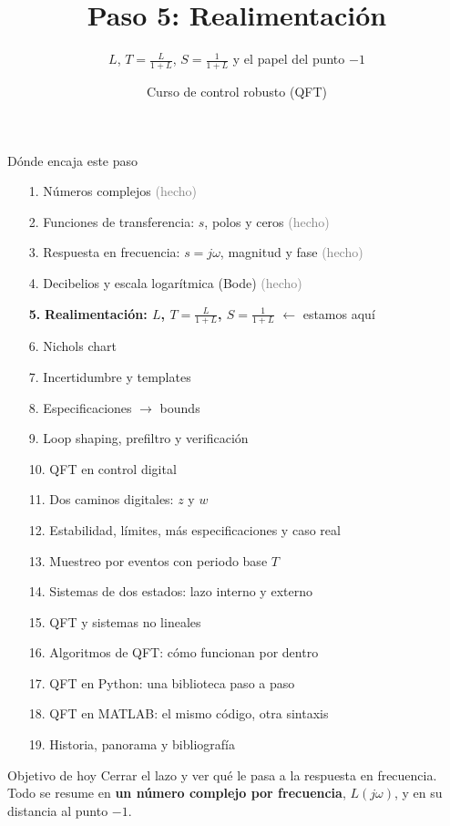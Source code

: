 \documentclass[aspectratio=169,11pt]{beamer}
\title[Realimentación]{Paso 5: Realimentación}
\subtitle{$L$, $T=\frac{L}{1+L}$, $S=\frac{1}{1+L}$ y el papel del punto $-1$}
\author{Curso de control robusto (QFT)}
\date{}
\begin{document}
\begin{frame}\titlepage\end{frame}

\begin{frame}{Dónde encaja este paso}
  \tiny
  \begin{enumerate}\setlength{\itemsep}{-2pt}
    \item[1.] Números complejos \hfill \textcolor{gray}{(hecho)}
    \item[2.] Funciones de transferencia: $s$, polos y ceros \hfill \textcolor{gray}{(hecho)}
    \item[3.] Respuesta en frecuencia: $s=j\omega$, magnitud y fase \hfill \textcolor{gray}{(hecho)}
    \item[4.] Decibelios y escala logarítmica (Bode) \hfill \textcolor{gray}{(hecho)}
    \item[\textbf{5.}] \textbf{Realimentación: $L$, $T=\frac{L}{1+L}$, $S=\frac{1}{1+L}$} \hfill $\leftarrow$ estamos aquí
    \item[6.] Nichols chart
    \item[7.] Incertidumbre y templates
    \item[8.] Especificaciones $\rightarrow$ bounds
    \item[9.] Loop shaping, prefiltro y verificación
    \item[10.] QFT en control digital
    \item[11.] Dos caminos digitales: $z$ y $w$
    \item[12.] Estabilidad, límites, más especificaciones y caso real
    \item[13.] Muestreo por eventos con periodo base $T$
    \item[14.] Sistemas de dos estados: lazo interno y externo
    \item[15.] QFT y sistemas no lineales
    \item[16.] Algoritmos de QFT: cómo funcionan por dentro
    \item[17.] QFT en Python: una biblioteca paso a paso
    \item[18.] QFT en MATLAB: el mismo código, otra sintaxis
    \item[19.] Historia, panorama y bibliografía
  \end{enumerate}
  \vspace{4pt}
  \begin{block}{Objetivo de hoy}
    Cerrar el lazo y ver qué le pasa a la respuesta en frecuencia. Todo se resume en \textbf{un número complejo por frecuencia}, $L(j\omega)$, y en su distancia al punto $-1$.
  \end{block}
\end{frame}
\end{document}
